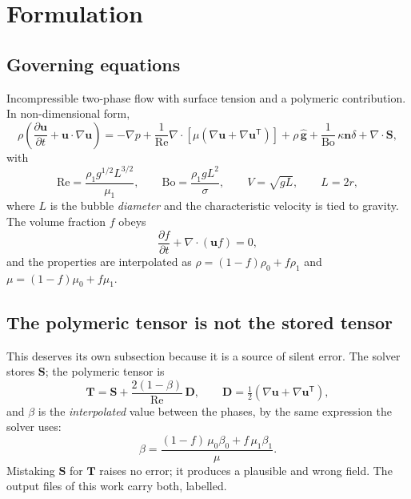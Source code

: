 \section{Formulation}
\label{sec:formulation}


\subsection{Governing equations}

Incompressible two-phase flow with surface tension and a polymeric
contribution. In non-dimensional form,
\begin{equation}
\rho\left(\frac{\partial \mathbf{u}}{\partial t}
          + \mathbf{u}\cdot\nabla\mathbf{u}\right)
= -\nabla p
  + \frac{1}{\mathrm{Re}}\nabla\cdot\!\left[\mu\left(\nabla\mathbf{u}
    + \nabla\mathbf{u}^{\mathsf{T}}\right)\right]
  + \rho\,\hat{\mathbf{g}}
  + \frac{1}{\mathrm{Bo}}\,\kappa\mathbf{n}\delta
  + \nabla\cdot\mathbf{S},
\label{eq:momentum}
\end{equation}
with
\begin{equation}
\mathrm{Re} = \frac{\rho_1 g^{1/2} L^{3/2}}{\mu_1},
\qquad
\mathrm{Bo} = \frac{\rho_1 g L^2}{\sigma},
\qquad
V = \sqrt{gL},
\qquad
L = 2r,
\label{eq:dimensionless}
\end{equation}
where $L$ is the bubble \emph{diameter} and the characteristic velocity is tied
to gravity. The volume fraction $f$ obeys
\begin{equation}
\frac{\partial f}{\partial t} + \nabla\cdot(\mathbf{u}f) = 0,
\label{eq:transport}
\end{equation}
and the properties are interpolated as $\rho = (1-f)\rho_0 + f\rho_1$ and
$\mu = (1-f)\mu_0 + f\mu_1$.

\subsection{The polymeric tensor is not the stored tensor}

This deserves its own subsection because it is a source of silent error. The
solver stores $\mathbf{S}$; the polymeric tensor is
\begin{equation}
\mathbf{T} = \mathbf{S} + \frac{2(1-\beta)}{\mathrm{Re}}\,\mathbf{D},
\qquad
\mathbf{D} = \tfrac{1}{2}\!\left(\nabla\mathbf{u}
           + \nabla\mathbf{u}^{\mathsf{T}}\right),
\label{eq:T-from-S}
\end{equation}
and $\beta$ is the \emph{interpolated} value between the phases, by the same
expression the solver uses:
\begin{equation}
\beta = \frac{(1-f)\,\mu_0\beta_0 + f\,\mu_1\beta_1}{\mu}.
\label{eq:beta-interp}
\end{equation}
Mistaking $\mathbf{S}$ for $\mathbf{T}$ raises no error; it produces a
plausible and wrong field. The output files of this work carry both, labelled.

